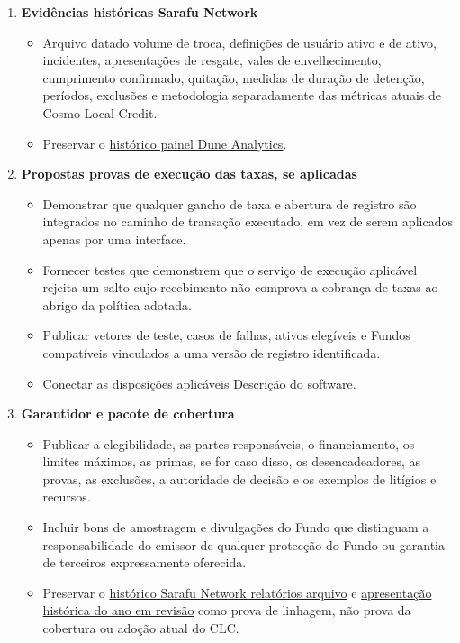 \documentclass[11pt]{article}
\begin{document}
\begin{enumerate}[leftmargin=*]
\item \textbf{Evidências históricas Sarafu Network}
\begin{itemize}[leftmargin=*]
\item Arquivo datado volume de troca, definições de usuário ativo e de ativo, incidentes, apresentações de resgate, vales de envelhecimento, cumprimento confirmado, quitação, medidas de duração de detenção, períodos, exclusões e metodologia separadamente das métricas atuais de Cosmo-Local Credit.
\item Preservar o \href{https://dune.com/grassrootseconomics/sarafu-network}{histórico painel Dune Analytics}.
\end{itemize}
\item \textbf{Propostas provas de execução das taxas, se aplicadas}
\begin{itemize}[leftmargin=*]
\item Demonstrar que qualquer gancho de taxa e abertura de registro são integrados no caminho de transação executado, em vez de serem aplicados apenas por uma interface.
\item Fornecer testes que demonstrem que o serviço de execução aplicável rejeita um salto cujo recebimento não comprova a cobrança de taxas ao abrigo da política adotada.
\item Publicar vetores de teste, casos de falhas, ativos elegíveis e Fundos compatíveis vinculados a uma versão de registro identificada.
\item Conectar as disposições aplicáveis \href{https://software.grassecon.org}{Descrição do software}.
\end{itemize}
\item \textbf{Garantidor e pacote de cobertura}
\begin{itemize}[leftmargin=*]
\item Publicar a elegibilidade, as partes responsáveis, o financiamento, os limites máximos, as primas, se for caso disso, os desencadeadores, as provas, as exclusões, a autoridade de decisão e os exemplos de litígios e recursos.
\item Incluir bons de amostragem e divulgações do Fundo que distinguam a responsabilidade do emissor de qualquer protecção do Fundo ou garantia de terceiros expressamente oferecida.
\item Preservar o \href{https://sarafu.network/reports}{histórico Sarafu Network relatórios arquivo} e \href{https://youtu.be/5yGaP31bvs0?si=fZ-AMTEXsmVR8Ulv}{apresentação histórica do ano em revisão} como prova de linhagem, não prova da cobertura ou adoção atual do CLC.

\end{itemize}
\end{enumerate}
\end{document}

